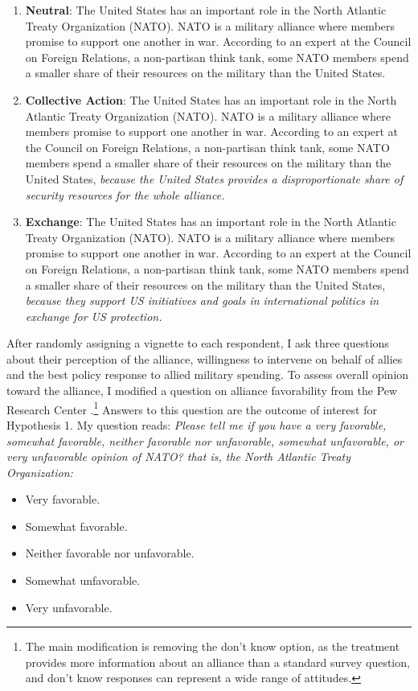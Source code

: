 \documentclass[12pt]{article}
\begin{document}
 
\begin{enumerate}

\item \textbf{Neutral}: The United States has an important role in the North Atlantic Treaty Organization (NATO). NATO is a military alliance where members promise to support one another in war. According to an expert at the Council on Foreign Relations, a non-partisan think tank, some NATO members spend a smaller share of their resources on the military than the United States. 

\item \textbf{Collective Action}: The United States has an important role in the North Atlantic Treaty Organization (NATO). NATO is a military alliance where members promise to support one another in war. According to an expert at the Council on Foreign Relations, a non-partisan think tank, some NATO members spend a smaller share of their resources on the military than the United States, \textit{because the United States provides a disproportionate share of security resources for the whole alliance.} 

\item \textbf{Exchange}: The United States has an important role in the North Atlantic Treaty Organization (NATO). NATO is a military alliance where members promise to support one another in war. According to an expert at the Council on Foreign Relations, a non-partisan think tank, some NATO members spend a smaller share of their resources on the military than the United States, \textit{because they support US initiatives and goals in international politics in exchange for US protection.}
 
\end{enumerate}  


After randomly assigning a vignette to each respondent, I ask three questions about their perception of the alliance, willingness to intervene on behalf of allies and the best policy response to allied military spending. 
To assess overall opinion toward the alliance, I modified a question on alliance favorability from the Pew Research Center \citep{PewNATO2020}.\footnote{The main modification is removing the don't know option, as the treatment provides more information about an alliance than a standard survey question, and don't know responses can represent a wide range of attitudes.} 
Answers to this question are the outcome of interest for Hypothesis 1. 
My question reads: \textit{Please tell me if you have a very favorable, somewhat favorable, neither favorable nor unfavorable, somewhat unfavorable, or very unfavorable opinion of NATO? that is, the North Atlantic Treaty Organization:} 
\begin{itemize}
\item Very favorable. 
\item Somewhat favorable. 
\item Neither favorable nor unfavorable.  
\item Somewhat unfavorable. 
\item Very unfavorable. 
\end{itemize}
\end{document}
